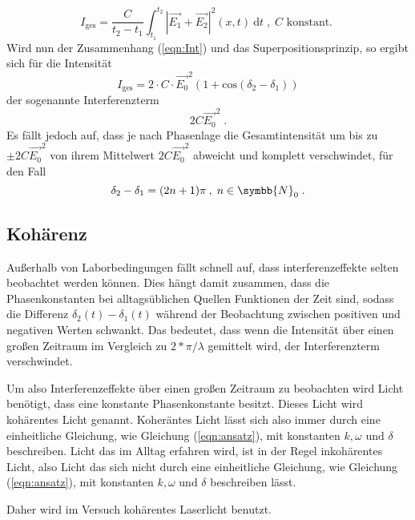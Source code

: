\begin{equation}
    I_\text{ges} = \frac{C}{t_2 - t_1} \int^{t_2}_{t_1} |\vec{E_1} + \vec{E_2}|^2 (x, t) \: \text{d}t 
    \; , \; C \text{ konstant. } 
\end{equation}
\noindent
Wird nun der Zusammenhang (\ref{eqn:Int}) und das Superpositionsprinzip, so ergibt sich für die Intensität 
\begin{equation*}
    I_\text{ges} = 2 \cdot C \cdot \vec{E_0}^2 (1 + \text{cos}(\delta_2 - \delta_1))
\end{equation*}
\noindent 
der sogenannte Interferenzterm 
\begin{equation*}
    2 C \vec{E_0}^2 \; .
\end{equation*}
\noindent 
Es fällt jedoch auf, dass je nach Phasenlage die Gesamtintensität um bis zu $\pm 2 C \vec{E_0}^2$ von ihrem Mittelwert $2 C \vec{E_0}^2$ abweicht und komplett verschwindet, für
den Fall 
\begin{equation}
    \delta_2 - \delta_1 = (2n + 1)\pi \: , \; n \in \symbb{N}_0 \; .
\end{equation}

\subsection{Kohärenz}
Außerhalb von Laborbedingungen fällt schnell auf, dass interferenzeffekte selten beobachtet werden können. Dies hängt damit zusammen, dass die Phasenkonstanten bei alltagsüblichen Quellen 
Funktionen der Zeit sind, sodass die Differenz $\delta_2(t) - \delta_1(t)$ während der Beobachtung zwischen positiven und negativen Werten schwankt. Das bedeutet, dass wenn die
Intensität über einen großen Zeitraum im Vergleich zu $2*\pi/\lambda$ gemittelt wird, der Interferenzterm verschwindet.

Um also Interferenzeffekte über einen großen Zeitraum zu beobachten wird Licht benötigt, dass eine konstante Phasenkonstante besitzt. Dieses Licht wird kohärentes Licht genannt. Koheräntes
Licht lässt sich also immer durch eine einheitliche Gleichung, wie Gleichung (\ref{eqn:ansatz}), mit konstanten $k, \omega \text{ und } \delta$ beschreiben. Licht das im Alltag erfahren wird, 
ist in der Regel inkohärentes Licht, also Licht das sich nicht durch eine einheitliche Gleichung, wie Gleichung (\ref{eqn:ansatz}), mit konstanten $k, \omega \text{ und } \delta$ beschreiben lässt.
\noindent

Daher wird im Versuch kohärentes Laserlicht benutzt.

